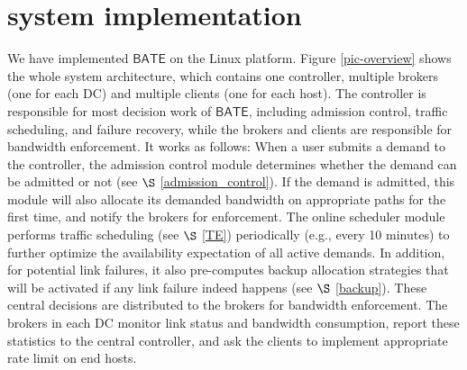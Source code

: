\documentclass[sigconf]{acmart}
\begin{document}
\section{system implementation} \label{system}
We have implemented $\mathsf{BATE}$ on the Linux platform. Figure \ref{pic-overview} shows the whole system architecture, which contains one controller, multiple brokers (one for each DC) and multiple clients (one for each host). The controller is responsible for most decision work of $\mathsf{BATE}$, including admission control, traffic scheduling, and failure recovery, while the brokers and clients are responsible for bandwidth enforcement.
It works as follows:
When a user submits a demand to the controller, the admission control module determines whether the demand can be admitted or not (see $\S$ \ref{admission_control}).
If the demand is admitted, this module will also allocate its demanded bandwidth on appropriate paths for the first time, and notify the brokers for enforcement. The online scheduler module performs traffic scheduling (see $\S$ \ref{TE}) periodically  (e.g., every 10 minutes) to further optimize the availability expectation of all active demands. In addition, 
for potential link failures, it also pre-computes backup allocation strategies that will be activated if any link failure indeed happens (see $\S$ \ref{backup}). These central decisions are distributed to the brokers for bandwidth enforcement. The brokers in each DC monitor link status and bandwidth consumption, report these statistics to the central controller, and ask the clients to implement appropriate rate limit on end hosts. 


\end{document}
